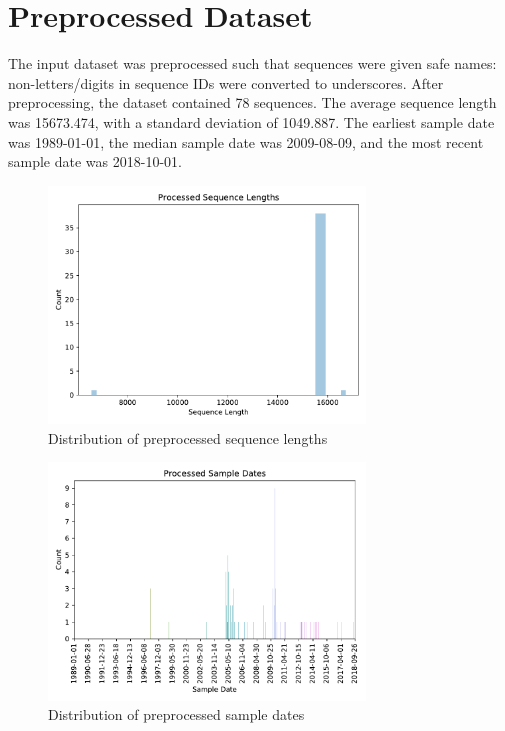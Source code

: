\documentclass{article}
\begin{document}
\section{Preprocessed Dataset}
The input dataset was preprocessed such that sequences were given safe names: non-letters/digits in sequence IDs were converted to underscores. After preprocessing, the dataset contained 78 sequences. The average sequence length was 15673.474, with a standard deviation of 1049.887. The earliest sample date was 1989-01-01, the median sample date was 2009-08-09, and the most recent sample date was 2018-10-01.

\begin{figure}[h]
\centering
\includegraphics[width=0.75\textwidth,keepaspectratio]{./figs/processed_sequence_lengths.pdf}
\caption{Distribution of preprocessed sequence lengths}
\end{figure}



\begin{figure}[h]
\centering
\includegraphics[width=0.75\textwidth,keepaspectratio]{./figs/processed_sample_dates.pdf}
\caption{Distribution of preprocessed sample dates}
\end{figure}
\end{document}
